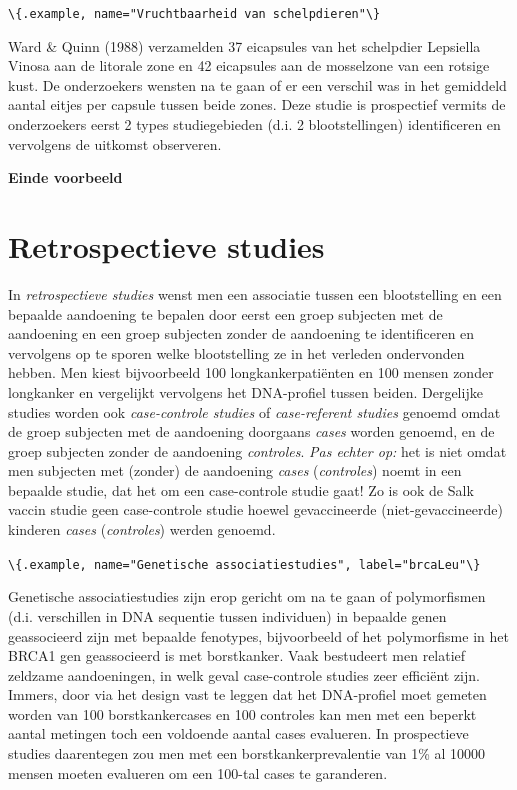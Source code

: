 \documentclass[
  12pt,dutch,coursenotes]{book}
\newcommand{\passthrough}[1]{#1}
\begin{document}
\passthrough{\lstinline!\{.example, name="Vruchtbaarheid van schelpdieren"\}!}

Ward \& Quinn (1988) verzamelden 37 eicapsules van het schelpdier Lepsiella Vinosa aan de litorale zone en 42 eicapsules aan de mosselzone van een rotsige kust. De onderzoekers wensten na te gaan of er een verschil was in het gemiddeld aantal eitjes per capsule tussen beide zones. Deze studie is prospectief vermits de onderzoekers eerst 2 types studiegebieden (d.i. 2 blootstellingen) identificeren en vervolgens de uitkomst observeren.

\textbf{Einde voorbeeld}

\hypertarget{subsec:design:retro}{%
\section{Retrospectieve studies}\label{subsec:design:retro}}

In \emph{retrospectieve studies} wenst men een associatie tussen een
blootstelling en een bepaalde aandoening te bepalen door eerst een groep
subjecten met de aandoening en een groep subjecten zonder de aandoening te
identificeren en vervolgens op te sporen welke blootstelling ze in het
verleden ondervonden hebben. Men kiest bijvoorbeeld 100
longkankerpatiënten en 100 mensen zonder longkanker en vergelijkt vervolgens het DNA-profiel tussen beiden. Dergelijke studies worden
ook \emph{case-controle studies} of \emph{case-referent studies} genoemd
omdat de groep subjecten met de aandoening doorgaans \emph{cases} worden genoemd,
en de groep subjecten zonder de aandoening \emph{controles}. \emph{Pas echter op:} het is niet omdat men subjecten met (zonder) de aandoening \emph{cases}
(\emph{controles}) noemt in een bepaalde studie, dat het om een case-controle
studie gaat! Zo is ook de Salk vaccin studie geen case-controle studie
hoewel gevaccineerde (niet-gevaccineerde) kinderen \emph{cases} (\emph{controles})
werden genoemd.

\passthrough{\lstinline!\{.example, name="Genetische associatiestudies", label="brcaLeu"\}!}

Genetische associatiestudies zijn erop gericht om na te gaan of polymorfismen (d.i. verschillen in DNA sequentie tussen individuen) in bepaalde genen geassocieerd zijn met bepaalde fenotypes, bijvoorbeeld of het polymorfisme in het BRCA1 gen geassocieerd is met borstkanker. Vaak bestudeert men relatief zeldzame aandoeningen, in welk geval case-controle studies zeer efficiënt zijn. Immers, door via het design vast te leggen dat het DNA-profiel moet gemeten worden van 100 borstkankercases en 100 controles kan men met een beperkt aantal metingen toch een voldoende aantal cases evalueren. In prospectieve studies daarentegen zou men met een borstkankerprevalentie van 1\% al 10000 mensen moeten evalueren om een 100-tal cases te garanderen.
\end{document}
